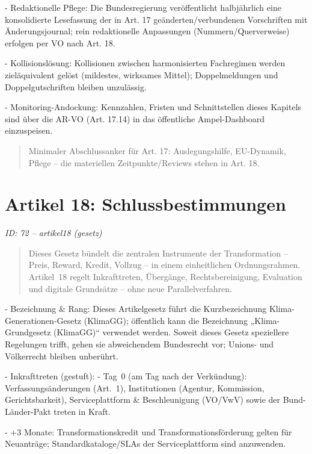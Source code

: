 \documentclass[12pt,a4paper]{scrartcl}
\begin{document}
- Redaktionelle Pflege: Die Bundesregierung veröffentlicht halbjährlich eine konsolidierte Lesefassung der in Art. 17 geänderten/verbundenen Vorschriften mit Änderungsjournal; rein redaktionelle Anpassungen (Nummern/Querverweise) erfolgen per VO nach Art. 18.

- Kollisionslösung: Kollisionen zwischen harmonisierten Fachregimen werden zieläquivalent gelöst (mildestes, wirksames Mittel); Doppelmeldungen und Doppelgutschriften bleiben unzulässig.

- Monitoring-Andockung: Kennzahlen, Fristen und Schnittstellen dieses Kapitels sind über die AR-VO (Art. 17.14) in das öffentliche Ampel-Dashboard einzuspeisen.

{\footnotesize\begin{quote}
Minimaler Abschlussanker für Art. 17: Auslegungshilfe, EU-Dynamik, Pflege -- die materiellen Zeitpunkte/Reviews stehen in Art. 18.
\end{quote}}



\section[Artikel 18: Schlussbestimmungen]{Artikel 18: Schlussbestimmungen}
\noindent\textit{ID: 72 -- artikel18 (gesetz)}

\begin{quote}
Dieses Gesetz bündelt die zentralen Instrumente der Transformation -- Preis, Reward, Kredit, Vollzug -- in einem einheitlichen Ordnungsrahmen. Artikel 18 regelt Inkrafttreten, Übergänge, Rechtsbereinigung, Evaluation und digitale Grundsätze -- ohne neue Parallelverfahren.
\end{quote}

- Bezeichnung \& Rang: Dieses Artikelgesetz führt die Kurzbezeichnung Klima-Generationen-Gesetz (KlimaGG); öffentlich kann die Bezeichnung „Klima-Grundgesetz (KlimaGG)“ verwendet werden. Soweit dieses Gesetz speziellere Regelungen trifft, gehen sie abweichendem Bundesrecht vor; Unions- und Völkerrecht bleiben unberührt.

- Inkrafttreten (gestuft):
- Tag 0 (am Tag nach der Verkündung): Verfassungsänderungen (Art. 1), Institutionen (Agentur, Kommission, Gerichtsbarkeit), Serviceplattform \& Beschleunigung (VO/VwV) sowie der Bund-Länder-Pakt treten in Kraft.

- +3 Monate: Transformationskredit und Transformationsförderung gelten für Neuanträge; Standardkataloge/SLAs der Serviceplattform sind anzuwenden.
\end{document}
